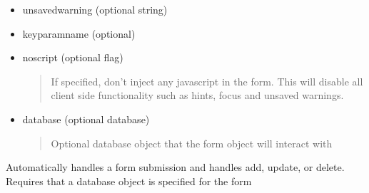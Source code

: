 \documentclass[letterpaper,10pt,english]{sphinxmanual}
\begin{document}
\begin{fulllineitems}
\begin{fulllineitems}
\begin{description}
\begin{itemize}
\item {} 
unsavedwarning (optional string)

\item {} 
keyparamname (optional)

\item {} 
noscript (optional flag)
\begin{quote}

If specified, don't inject any javascript in the form. This will disable all client side functionality such as hints, focus and unsaved warnings.
\end{quote}

\item {} 
database (optional database)
\begin{quote}

Optional database object that the form object will interact with
\end{quote}

\end{itemize}

\end{description}

\end{fulllineitems}


\begin{fulllineitems}
\label{knop_form:knop_form.process}
Automatically handles a form submission and handles add, update, or delete.
Requires that a database object is specified for the form

\end{fulllineitems}


\begin{fulllineitems}
\label{knop_form:knop_form.raw}
\end{fulllineitems}



\begin{fulllineitems}
\end{fulllineitems}


\begin{fulllineitems}
\label{knop_form:knop_form.removeField}
\end{fulllineitems}


\end{fulllineitems}
\end{document}
